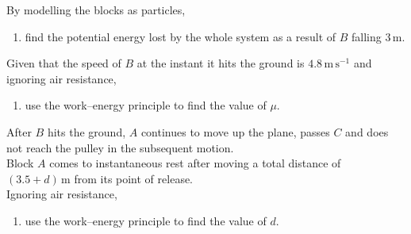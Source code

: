 \documentclass[leqno]{article}
\begin{document}
\begin{enumerate}[
  label=\textbf{\arabic*.},
  leftmargin=*,
  topsep=0pt,
  partopsep=0pt,
  parsep=0pt
]
By modelling the blocks as particles, \\

\begin{enumerate}[label=\textbf{(\alph*)}]
  \item find the potential energy lost by the whole system as a result of $B$ falling $3\,\mathrm{m}$.  \\
\end{enumerate}

Given that the speed of $B$ at the instant it hits the ground is $4.8\,\mathrm{m\,s^{-1}}$ and ignoring air resistance, \\

\begin{enumerate}[label=\textbf{(\alph*)}, resume]
  \item use the work--energy principle to find the value of $\mu$.  \\
\end{enumerate}

After $B$ hits the ground, $A$ continues to move up the plane, passes $C$ and does not reach the pulley in the subsequent motion. \\

Block $A$ comes to instantaneous rest after moving a total distance of $(3.5+d)\,\mathrm{m}$ from its point of release. \\

Ignoring air resistance, \\

\begin{enumerate}[label=\textbf{(\alph*)}, resume]
  \item use the work--energy principle to find the value of $d$.  \\
\end{enumerate}


\end{enumerate}
\end{document}
